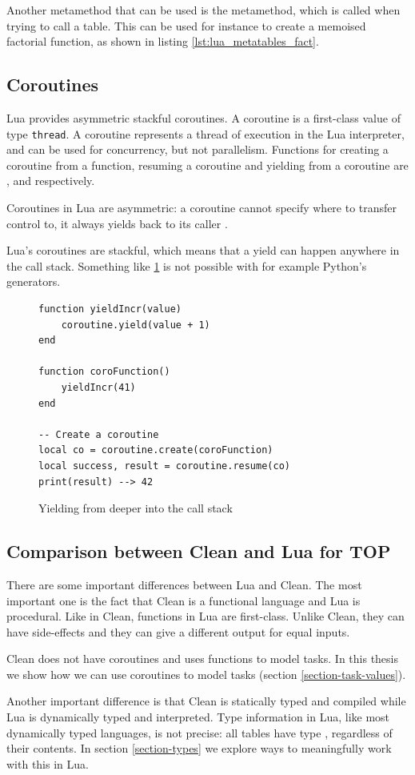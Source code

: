 Another metamethod that can be used is the  metamethod, which is called when trying to call a table. This can be used for instance to create a memoised factorial function, as shown in listing \ref{lst:lua_metatables_fact}.

\subsection{Coroutines}\label{section-lua-coroutines}
Lua provides asymmetric stackful coroutines. A coroutine is a first-class value of type \texttt{thread}. A coroutine represents a thread of execution in the Lua interpreter, and can be used for concurrency, but not parallelism. Functions for creating a coroutine from a function, resuming a coroutine and yielding from a coroutine are ,  and  respectively.

Coroutines in Lua are asymmetric: a coroutine cannot specify where to transfer control to, it always yields back to its caller \cite{moura2009revisiting}.

Lua's coroutines are stackful, which means that a yield can happen anywhere in the call stack. Something like \ref{lst:lua_coroutines} is not possible with for example Python's generators.

\begin{figure}[ht]
\centering
\begin{verbatim}
function yieldIncr(value)
    coroutine.yield(value + 1)
end

function coroFunction()
    yieldIncr(41)
end

-- Create a coroutine
local co = coroutine.create(coroFunction)
local success, result = coroutine.resume(co)
print(result) --> 42
\end{verbatim}
\caption{Yielding from deeper into the call stack}
\label{lst:lua_coroutines}
\end{figure}

\subsection{Comparison between Clean and Lua for TOP}
There are some important differences between Lua and Clean. The most important one is the fact that Clean is a functional language and Lua is procedural. Like in Clean, functions in Lua are first-class. Unlike Clean, they can have side-effects and they can give a different output for equal inputs.

Clean does not have coroutines and uses functions to model tasks. In this thesis we show how we can use coroutines to model tasks (section \ref{section-task-values}).

Another important difference is that Clean is statically typed and compiled while Lua is dynamically typed and interpreted. Type information in Lua, like most dynamically typed languages, is not precise: all tables have type , regardless of their contents. In section \ref{section-types} we explore ways to meaningfully work with this in Lua.

